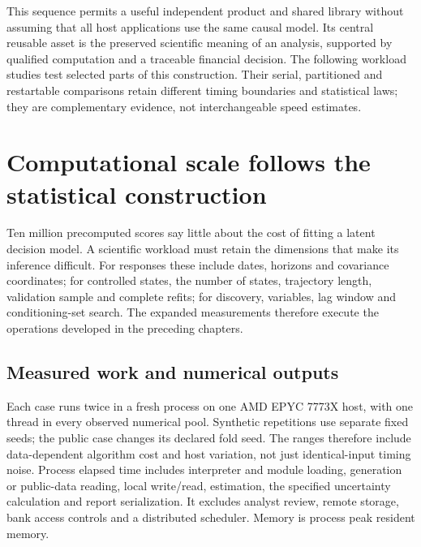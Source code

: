 This sequence permits a useful independent product and shared library
without assuming that all host applications use the same causal model.
Its central reusable asset is the preserved scientific meaning of an
analysis, supported by qualified computation and a traceable financial
decision. The following workload studies test selected parts of this construction. Their serial, partitioned and restartable comparisons retain different timing boundaries and statistical laws; they are complementary evidence, not interchangeable speed estimates.


\section{Computational scale follows the statistical construction}
\label{s5:dominant-workloads}
Ten million precomputed scores say little about the cost of fitting a latent
decision model. A scientific workload must retain the dimensions that make
its inference difficult. For responses these include dates, horizons and
covariance coordinates; for controlled states, the number of states,
trajectory length, validation sample and complete refits; for discovery,
variables, lag window and conditioning-set search. The expanded measurements
therefore execute the operations developed in the preceding chapters.

\subsection{Measured work and numerical outputs}
Each case runs twice in a fresh process on one AMD EPYC 7773X host, with one
thread in every observed numerical pool. Synthetic repetitions use separate
fixed seeds; the public case changes its declared fold seed. The ranges
therefore include data-dependent algorithm cost and host variation, not just
identical-input timing noise. Process elapsed time includes interpreter and
module loading, generation or public-data reading, local write/read,
estimation, the specified uncertainty calculation and report serialization.
It excludes analyst review, remote storage, bank access controls and a
distributed scheduler. Memory is process peak resident memory.

